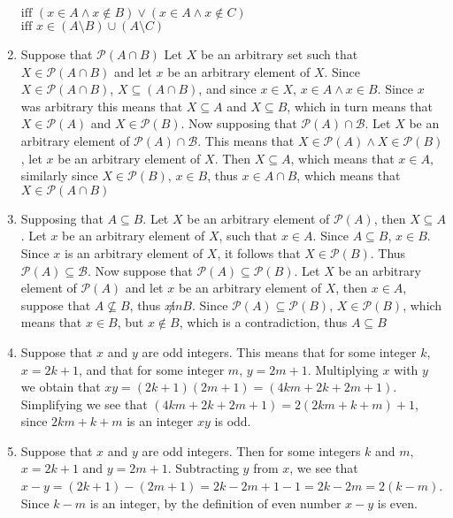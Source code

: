 \begin{enumerate}
    $\text{iff } (x \in A \land x \notin B) \lor (x \in A \land x \notin C)$\\
    $\text{iff } x \in (A \setminus B) \cup (A \setminus C)$
    \item
    Suppose that $\mathscr{P}(A \cap B)$ Let $X$ be an arbitrary set such that $X \in \mathscr{P}(A \cap B)$ and let $x$ be an arbitrary element of $X$. Since $X \in \mathscr{P}(A \cap B)$, $X \subseteq (A \cap B)$, and since $x \in X$, $x \in A \land x \in B$. Since $x$ was arbitrary this means that $X \subseteq A$ and $X \subseteq B$, which in turn means that $X \in \mathscr{P}(A)$ and $X \in \mathscr{P}(B)$.
    Now supposing that $\mathscr{P}(A) \cap \mathscr{B}$. Let $X$ be an arbitrary element of $\mathscr{P}(A) \cap \mathscr{B}$. This means that $X \in \mathscr{P}(A) \land X \in \mathscr{P}(B)$, let $x$ be an arbitrary element of $X$. Then $X \subseteq A$, which means that $x \in A$, similarly since $X \in \mathscr{P}(B)$, $x \in B$, thus $x \in A \cap B$, which means that $X \in \mathscr{P}(A \cap B)$
    \item
    Supposing that $A \subseteq B$. Let $X$ be an arbitrary element of $\mathscr{P}(A)$, then $X \subseteq A$. Let $x$ be an arbitrary element of $X$, such that $x \in A$. Since $A \subseteq B$, $x \in B$. Since $x$ is an arbitrary element of $X$, it follows that $X \in \mathscr{P}(B)$. Thus $\mathscr{P}(A) \subseteq \mathscr{B}$.
    Now suppose that $\mathscr{P}(A) \subseteq \mathscr{P}(B)$. Let $X$ be an arbitrary element of $\mathscr{P}(A)$ and let $x$ be an arbitrary element of $X$, then $x \in A$, suppose that $A \not \subseteq B$, thus $x \not in B$. Since $\mathscr{P}(A) \subseteq \mathscr{P}(B)$, $X \in \mathscr{P}(B)$, which means that $x \in B$, but $x \notin B$, which is a contradiction, thus $A \subseteq B$
    \item
    Suppose that $x$ and $y$ are odd integers. This means that for some integer $k$, $x = 2k + 1$, and that for some integer $m$, $y = 2m + 1$. Multiplying $x$ with $y$ we obtain that $xy = (2k + 1)(2m + 1) = (4km + 2k + 2m + 1)$. Simplifying we see that $(4km + 2k + 2m + 1) = 2(2km + k + m) + 1$, since $2km + k + m$ is an integer $xy$ is odd.
    \item
    Suppose that $x$ and $y$ are odd integers. Then for some integers $k$ and $m$, $x = 2k + 1$ and $y = 2m + 1$. Subtracting $y$ from $x$, we see that $x - y = (2k + 1) - (2m + 1) = 2k -2m + 1 - 1 = 2k - 2m = 2(k - m)$. Since $k - m$ is an integer, by the definition of even number $x - y$ is even.

\end{enumerate}

